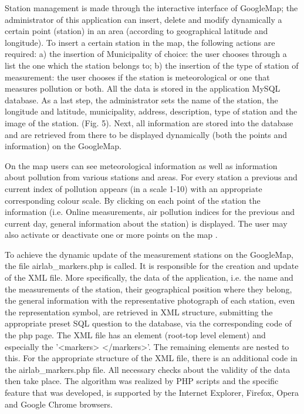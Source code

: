 \documentclass[conference]{IEEEtran}
\begin{document}
Station management is made through the interactive interface of GoogleMap; the administrator of this application can insert, delete and modify dynamically a certain point (station) in an area (according to geographical latitude and longitude). To insert a certain station in the map, the following actions are required: a) the insertion of Municipality of choice: the user chooses through a list the one which the station belongs to; b) the insertion of  the type of station of measurement: the user chooses if the station is meteorological or one that measures pollution or both. All the data is stored in the application MySQL database.  As a last step, the administrator sets the name of the station, the longitude and latitude, municipality, address, description, type of station and the image of the station. (Fig. 5). Next, all information are stored into the database and are retrieved from there to be displayed dynamically (both the points and information) on the GoogleMap.  

On the map users can see meteorological information as well as information about pollution from various stations and areas. For every station a previous and current index of pollution appears (in a scale 1-10) with an appropriate corresponding colour scale. By clicking on each point of the station the information (i.e. Online measurements, air pollution indices for the previous and current day, general information about the station) is displayed. The user may also activate or deactivate one or more points on the map \cite {TriantSkordas}.

To achieve the dynamic update of the measurement stations on the GoogleMap, the file airlab\_markers.php is called. It is responsible for the creation and update of the XML file. More specifically, the data of the  application, i.e. the name and the measurements of the station, their geographical position where they belong, the general information with the representative photograph of each station, even the representation symbol, are retrieved in XML structure, submitting the appropriate preset SQL question to the database, via the corresponding code of the php page.
The XML file has an element (root-top level element) and especially the '<markers> </markers>'. The remaining elements are nested to this. For the appropriate structure of the XML file, there is an additional code in the airlab\_markers.php file. All necessary checks about the validity of the data then take place. The algorithm was realized by PHP scripts and the specific feature that was developed, is supported by the Internet Explorer, Firefox, Opera and Google Chrome browsers.
 
\end{document}
